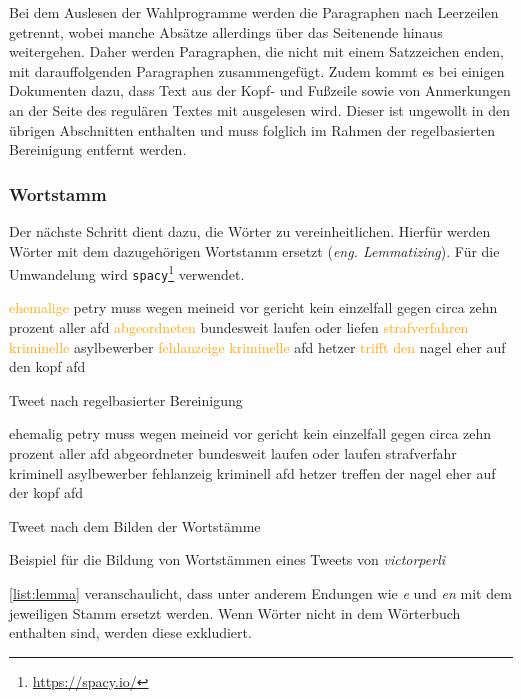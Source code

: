 Bei dem Auslesen der Wahlprogramme werden die Paragraphen nach Leerzeilen getrennt, wobei manche Absätze allerdings über das Seitenende hinaus weitergehen. Daher werden Paragraphen, die nicht mit einem Satzzeichen enden, mit darauffolgenden Paragraphen zusammengefügt. Zudem kommt es bei einigen Dokumenten dazu, dass Text aus der Kopf- und Fußzeile sowie von Anmerkungen an der Seite des regulären Textes mit ausgelesen wird. Dieser ist ungewollt in den übrigen Abschnitten enthalten und muss folglich im Rahmen der regelbasierten Bereinigung entfernt werden.

\subsubsection{Wortstamm}

Der nächste Schritt dient dazu, die Wörter zu vereinheitlichen. Hierfür werden Wörter mit dem dazugehörigen Wortstamm ersetzt (\textit{eng. Lemmatizing}). Für die Umwandelung wird \texttt{spacy}\footnote{\href{https://spacy.io/}{https://spacy.io/}} verwendet.

\begin{example}[H]
    {\footnotesize
        \begin{subexample}{0.45\textwidth}
            \textcolor{orange}{ehemalige} petry muss wegen meineid vor gericht kein einzelfall gegen circa zehn prozent aller afd \textcolor{orange}{abgeordneten} bundesweit laufen oder liefen \textcolor{orange}{strafverfahren} \textcolor{orange}{kriminelle} asylbewerber \textcolor{orange}{fehlanzeige} \textcolor{orange}{kriminelle} afd hetzer \textcolor{orange}{trifft} \textcolor{orange}{den} nagel eher auf den kopf afd
            \caption{Tweet nach regelbasierter Bereinigung}
        \end{subexample}\hfill
        \begin{subexample}{0.45\textwidth}
            ehemalig petry muss wegen meineid vor gericht kein einzelfall gegen circa zehn prozent aller afd abgeordneter bundesweit laufen oder laufen strafverfahr kriminell asylbewerber fehlanzeig kriminell afd hetzer treffen der nagel eher auf der kopf afd
            \caption{Tweet nach dem Bilden der Wortstämme}
        \end{subexample}\hfill
    }
    \caption[Bildung von Wortstämmen]{Beispiel für die Bildung von Wortstämmen eines Tweets von \textit{victorperli} \autocite{saltzer_finding_2022}} \label{list:lemma}
\end{example}

\autoref{list:lemma} veranschaulicht, dass unter anderem Endungen wie \textit{e} und \textit{en} mit dem jeweiligen Stamm ersetzt werden. Wenn Wörter nicht in dem Wörterbuch enthalten sind, werden diese exkludiert.

